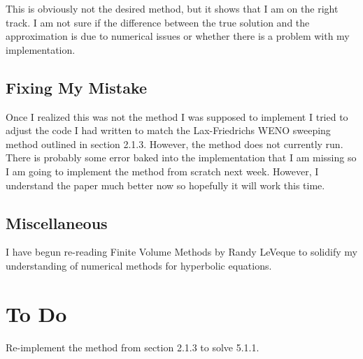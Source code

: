 \documentclass{article}
\begin{document}
This is obviously not the desired method, but it shows that I am on the right track. I am not sure if the difference between the true solution and the approximation is due to numerical issues or whether there is a problem with my implementation. 
\subsection*{Fixing My Mistake}
Once I realized this was not the method I was supposed to implement I tried to adjust the code I had written to match the Lax-Friedrichs WENO sweeping method outlined in section 2.1.3. However, the method does not currently run. There is probably some error baked into the implementation that I am missing so I am going to implement the method from scratch next week. However, I understand the paper much better now so hopefully it will work this time.
\subsection*{Miscellaneous}
I have begun re-reading Finite Volume Methods by Randy LeVeque to solidify my understanding of numerical methods for hyperbolic equations.
\section{To Do}
Re-implement the method from section 2.1.3 to solve 5.1.1.
\end{document}
